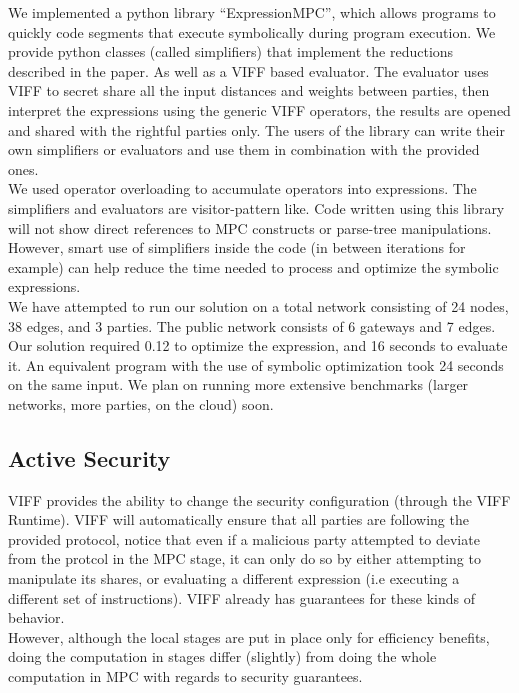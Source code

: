 We implemented a python library ``ExpressionMPC'', which allows programs to quickly code segments that execute symbolically during program execution. We provide python classes (called simplifiers) that implement the reductions described in the paper. As well as a VIFF\cite{viff} based evaluator. The evaluator uses VIFF to secret share all the input distances and weights between parties, then interpret the expressions using the generic VIFF operators, the results are opened and shared with the rightful parties only. The users of the library can write their own simplifiers or evaluators and use them in combination with the provided ones. \\

We used operator overloading to accumulate operators into expressions. The simplifiers and evaluators are visitor-pattern like. Code written using this library will not show direct references to MPC constructs or parse-tree manipulations. However, smart use of simplifiers inside the code (in between iterations for example) can help reduce the time needed to process and optimize the symbolic expressions. \\

We have attempted to run our solution on a total network consisting of 24 nodes, 38 edges, and 3 parties. The public network consists of 6 gateways and 7 edges. Our solution required 0.12 to optimize the expression, and 16 seconds to evaluate it. An equivalent program with the use of symbolic optimization took 24 seconds on the same input. We plan on running more extensive benchmarks (larger networks, more parties, on the cloud) soon.

\subsection{Active Security}
VIFF provides the ability to change the security configuration (through the VIFF Runtime). VIFF will automatically ensure that all parties are following the provided protocol, notice that even if a malicious party attempted to deviate from the protcol in the MPC stage, it can only do so by either attempting to manipulate its shares, or evaluating a different expression (i.e executing a different set of instructions). VIFF already has guarantees for these kinds of behavior. \\

However, although the local stages are put in place only for efficiency benefits, doing the computation in stages differ (slightly) from doing the whole computation in MPC with regards to security guarantees. \\

